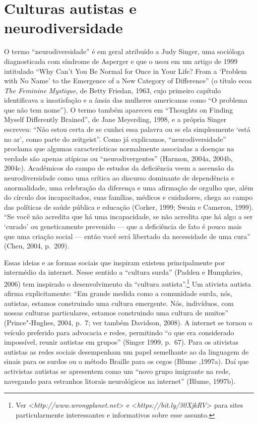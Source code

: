\section{Culturas autistas e neurodiversidade}

O termo ``neurodiversidade'' é em geral atribuído a Judy Singer, uma
socióloga diagnosticada com síndrome de Asperger e que o usou em um
artigo de 1999 intitulado ``Why Can't You Be Normal for Once in Your
Life? From a `Problem with No Name' to the Emergence of a New Category
of Difference'' (o título ecoa \emph{The Feminine Mystique}, de Betty
Friedan, 1963, cujo primeiro capítulo identificava a insatisfação e a
ânsia das mulheres americanas como ``O problema que não tem nome''). O
termo também apareceu em ``Thoughts on Finding Myself Differently
Brained'', de Jane Meyerding, 1998, e a própria Singer escreveu: ``Não
estou certa de se cunhei essa palavra ou se ela simplesmente `está no
ar', como parte do zeitgeist''. Como já explicamos, ``neurodiversidade''
proclama que algumas características normalmente associadas a doenças na
verdade são apenas atípicas ou ``neurodivergentes'' (Harmon, 2004a,
2004b, 2004c). Acadêmicos do campo de estudos da deficiência veem a
ascensão da neurodiversidade como uma crítica ao discurso dominante de
dependência e anormalidade, uma celebração da diferença e uma afirmação
de orgulho que, além do círculo dos incapacitados, suas famílias,
médicos e cuidadores, chega ao campo das políticas de saúde pública e
educação (Corker, 1999; Swain e Cameron, 1999). ``Se você não acredita
que há uma incapacidade, se não acredita que há algo a ser `curado' ou
geneticamente prevenido --- que a deficiência de fato é pouco mais que
uma criação social --- então você será libertado da necessidade de uma
cura'' (Cheu, 2004, p.~209).

Essas ideias e as formas sociais que inspiram existem principalmente por
intermédio da internet. Nesse sentido a ``cultura surda'' (Padden e
Humphries, 2006) tem inspirado o desenvolvimento da ``cultura
autista''.\footnote[17]{Ver \textless{}\emph{http://www.wrongplanet.net}\textgreater{} e
\textless{}\emph{https://bit.ly/30XjkRV}\textgreater{}
para sites particularmente interessantes e informativos sobre esse
assunto.} Um ativista autista afirma
explicitamente: ``Em grande medida como a comunidade surda, nós,
autistas, estamos construindo uma cultura emergente. Nós, indivíduos,
com nossas culturas particulares, estamos construindo uma cultura de
muitos'' (Prince"-Hughes, 2004, p.~7; ver também Davidson, 2008). A
internet se tornou o veículo preferido para advocacia e redes,
permitindo ``o que era considerado impossível, reunir autistas em
grupos'' (Singer 1999, p.~67). Para os ativistas autistas as redes
sociais desempenham um papel semelhante ao da linguagem de sinais para
os surdos ou o método Braille para os cegos (Blume ,1997a). Daí que
activistas autistas se apresentem como um ``novo grupo imigrante na
rede, navegando para estranhos litorais neurológicos na internet''
(Blume, 1997b).

